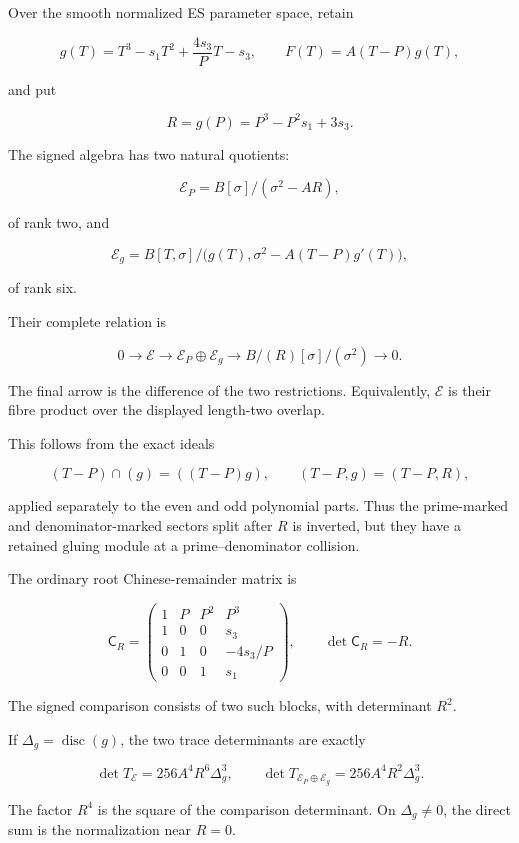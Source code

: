 Over the smooth normalized ES parameter space, retain

\[
g(T)=T^3-s_1T^2+\frac{4s_3}{P}T-s_3,
\qquad
F(T)=A(T-P)g(T),
\]

and put

\[
R=g(P)=P^3-P^2s_1+3s_3.
\]

The signed algebra has two natural quotients:

\[
\mathscr E_P
=
B[\sigma]/(\sigma^2-AR),
\]

of rank two, and

\[
\mathscr E_g
=
B[T,\sigma]/
\bigl(g(T),\sigma^2-A(T-P)g'(T)\bigr),
\]

of rank six.

Their complete relation is

\[
\boxed{
0\longrightarrow\mathscr E
\longrightarrow\mathscr E_P\oplus\mathscr E_g
\longrightarrow
B/(R)[\sigma]/(\sigma^2)
\longrightarrow0.
}
\tag{32}
\]

The final arrow is the difference of the two restrictions. Equivalently,
\(\mathscr E\) is their fibre product over the displayed length-two
overlap.

This follows from the exact ideals

\[
(T-P)\cap(g)=((T-P)g),
\qquad
(T-P,g)=(T-P,R),
\]

applied separately to the even and odd polynomial parts. Thus the
prime-marked and denominator-marked sectors split after \(R\) is
inverted, but they have a retained gluing module at a prime--denominator
collision.

The ordinary root Chinese-remainder matrix is

\[
\mathsf C_R=
\begin{pmatrix}
1&P&P^2&P^3\\
1&0&0&s_3\\
0&1&0&-4s_3/P\\
0&0&1&s_1
\end{pmatrix},
\qquad
\det\mathsf C_R=-R.
\tag{33}
\]

The signed comparison consists of two such blocks, with determinant
\(R^2\).

If \(\Delta_g=\operatorname{disc}(g)\), the two trace determinants are
exactly

\[
\boxed{
\det T_{\mathscr E}=256A^4R^6\Delta_g^3,
\qquad
\det T_{\mathscr E_P\oplus\mathscr E_g}
=256A^4R^2\Delta_g^3.
}
\tag{34}
\]

The factor \(R^4\) is the square of the comparison determinant. On
\(\Delta_g\ne0\), the direct sum is the normalization near \(R=0\).

